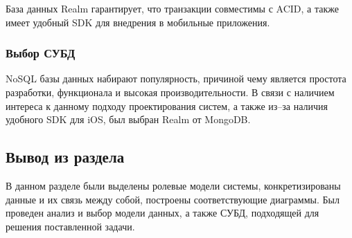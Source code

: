 База данных Realm гарантирует, что транзакции совместимы с ACID, а также имеет удобный SDK для внедрения в мобильные приложения.

\subsubsection{Выбор СУБД}

NoSQL базы данных набирают популярность, причиной чему является простота разработки, функционала и высокая производительности. В связи с наличием интереса к данному подходу проектирования систем, а также из--за наличия удобного SDK для iOS, был выбран Realm от MongoDB.

\subsection{Вывод из раздела}

В данном разделе были выделены ролевые модели системы, конкретизированы данные и их связь между собой, построены соответствующие диаграммы. Был проведен анализ и выбор модели данных, а также СУБД, подходящей для решения поставленной задачи. 
